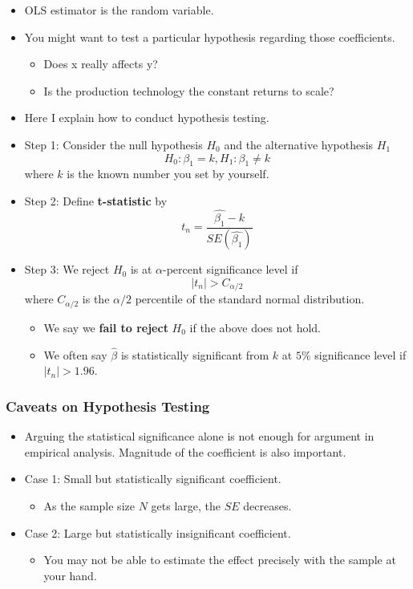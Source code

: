 \documentclass[]{book}
\providecommand{\tightlist}{%
  \setlength{\itemsep}{0pt}\setlength{\parskip}{0pt}}
\begin{document}
\begin{itemize}
\item
  OLS estimator is the random variable.
\item
  You might want to test a particular hypothesis regarding those coefficients.

  \begin{itemize}
  \tightlist
  \item
    Does x really affects y?
  \item
    Is the production technology the constant returns to scale?
  \end{itemize}
\item
  Here I explain how to conduct hypothesis testing.
\item
  Step 1: Consider the null hypothesis \(H_{0}\) and the alternative hypothesis \(H_{1}\)
  \[
    H_{0}:\beta_{1}=k,H_{1}:\beta_{1}\neq k
    \]
  where \(k\) is the known number you set by yourself.
\item
  Step 2: Define \textbf{t-statistic} by
  \[
    t_{n}=\frac{\hat{\beta_1}-k}{SE(\hat{\beta_1})}
    \]
\item
  Step 3: We reject \(H_{0}\) is at \(\alpha\)-percent significance level if
  \[|t_{n}|>C_{\alpha/2} 
  \]
  where \(C_{\alpha/2}\) is the \(\alpha/2\) percentile of the standard normal distribution.

  \begin{itemize}
  \tightlist
  \item
    We say we \textbf{fail to reject} \(H_0\) if the above does not hold.
  \item
    We often say \(\hat{\beta}\) is statistically significant from \(k\) at \(5\%\) significance level if \(|t_{n}|>1.96\).
  \end{itemize}
\end{itemize}

\hypertarget{caveats-on-hypothesis-testing}{%
\subsubsection{Caveats on Hypothesis Testing}\label{caveats-on-hypothesis-testing}}

\begin{itemize}
\tightlist
\item
  Arguing the statistical significance alone is not enough for argument in empirical analysis. Magnitude of the coefficient is also important.
\item
  Case 1: Small but statistically significant coefficient.

  \begin{itemize}
  \tightlist
  \item
    As the sample size \(N\) gets large, the \(SE\) decreases.
  \end{itemize}
\item
  Case 2: Large but statistically insignificant coefficient.

  \begin{itemize}
  \tightlist
  \item
    You may not be able to estimate the effect precisely with the sample at your hand.
  \end{itemize}
\end{itemize}
\end{document}
